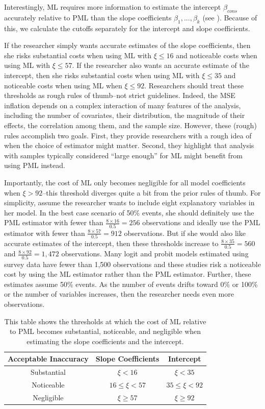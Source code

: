 \documentclass[12pt]{article}
\begin{document}
Interestingly, ML requires more information to estimate the intercept $\beta_{cons}$ accurately relative to PML than the slope coefficients $\beta_1,..., \beta_k$ (see \citealt{KingZeng2001}).
Because of this, we calculate the cutoffs separately for the intercept and slope coefficients.

If the researcher simply wants accurate estimates of the slope coefficients, then she risks substantial costs when using ML with $\xi \leq 16$ and noticeable costs when using ML with $\xi \leq 57$. If the researcher also wants an accurate estimate of the intercept, then she risks substantial costs when using ML with $\xi \leq 35$ and noticeable costs when using ML when $\xi \leq 92$. 
Researchers should treat these thresholds as rough rules of thumb--not strict guidelines.
Indeed, the MSE inflation depends on a complex interaction of many features of the analysis, including the number of covariates, their distribution, the magnitude of their effects, the correlation among them, and the sample size. 
However, these (rough) rules accomplish two goals.
First, they provide researchers with a rough idea of when the choice of estimator might matter.
Second, they highlight that analysis with samples typically considered ``large enough'' for ML might benefit from using PML instead.

Importantly, the cost of ML only becomes negligible for all model coefficients when $\xi > 92$--this threshold diverges quite a bit from the prior rules of thumb.
For simplicity, assume the researcher wants to include eight explanatory variables in her model.
In the best case scenario of 50\% events, she should definitely use the PML estimator with fewer than $\frac{8 \times 16}{0.5} = 256$ observations and ideally use the PML estimator with fewer than $\frac{8 \times 57}{0.5} = 912$ observations.  
But if she would also like accurate estimates of the intercept, then these thresholds increase to $\frac{8 \times 35}{0.5} = 560$ and $\frac{8 \times 92}{0.5} = 1,472$ observations. 
Many logit and probit models estimated using survey data have fewer than 1,500 observations and these studies risk a noticeable cost by using the ML estimator rather than the PML estimator.
Further, these estimates assume 50\% events. 
As the number of events drifts toward 0\% or 100\% or the number of variables increases, then the researcher needs even more observations.

\begin{table}[h]
\centering
\begin{tabular}{ccc}
\hline
Acceptable Inaccuracy   &  Slope Coefficients     & Intercept        \\ \hline
Substantial & $\xi < 16$         & $\xi < 35$          \\
Noticeable  & $16 \leq \xi < 57$ & $35 \leq \xi < 92$ \\
Negligible  & $\xi \geq 57$        & $\xi \geq 92$        
\end{tabular}
\caption{This table shows the thresholds at which the cost of ML relative to PML becomes substantial, noticeable, and negligible when estimating the slope coefficients and the intercept.}\label{tbl:thresholds}
\end{table}
\end{document}
